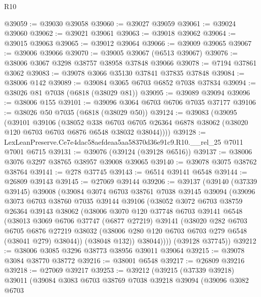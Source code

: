 \begin{lexlean}{R10}
\begin{coremodule}
@39059 := @39030 @39058
@39060 := @39027 @39059
@39061 := @39024 @39060
@39062 := @39021 @39061
@39063 := @39018 @39062
@39064 := @39015 @39063
@39065 := @39012 @39064
@39066 := @39009 @39065
@39067 := @39006 @39066
@39070 := @39005 @39067 (@6513 @39067)
@39076 := @38006 @3067 @3298 @38757 @38958 @37848 @39066
@39078 := @7194 @37861 @3062
@39083 := @39078 @3066 @35130 @37841 @37835 @37848
@39084 := @38006 @142
@39089 := @39084 @3065 @6703 @6852 @7038 @37834
@39094 := @38026 @81 @7038 (@6818 (@38029 @81))
@39095 := @39089 @39094
@39096 := @38006 @155
@39101 := @39096 @3064 @6703 @6706 @7035 @37177
@39106 := @38026 @50 @7035 (@6818 (@38029 @50))
@39124 := @39083
    (@39095
      (@39101
        @39106
        (@38052
          @338
          @6703
          @6705
          @26364
          @6878
          @38062
          (@38020 @120 @6703 @6703 @6876 @6548 @38032 @38044))))
@39128 := LexLeanPreserve.Ce7e4dac58aefdeaa5aa58370d36e91c9.R10.__rel_25 @7011 @7001 @6715
@39131 := @39076 (@39124 (@39128 @6516))
@39137 := @38006 @3076 @3297 @38765 @38957 @39008 @39065
@39140 := @39078 @3075 @38762 @38764
@39141 := @278 @37745
@39143 := @6514 @39141 @6548
@39144 := @26809 @39143
@39145 := @27069 @39144
@39206 := @39137
    (@39140
      (@37339 @39145)
      @39008
      (@39084
        @3074
        @6703
        @38761
        @7038
        @39145
        @39094
        (@39096
          @3073
          @6703
          @38760
          @7035
          @39144
          @39106
          (@38052
            @3072
            @6703
            @38759
            @26364
            @39143
            @38062
            (@38006
              @3070
              @120
              @37748
              @6703
              @39141
              @6548
              (@38013
                @3069
                @6706
                @37747
                (@6877 @27219)
                @39141
                (@38020
                  @282
                  @6703
                  @6705
                  @6876
                  @27219
                  @38032
                  (@38006 @280 @120 @6703 @6703 @279 @6548 (@38041 @279) @38044))
                (@38048 @132))
              @38044))))
      (@39128 @37745))
@39212 := @38006 @3085 @3296 @38773 @38956 @39011 @39064
@39215 := @39078 @3084 @38770 @38772
@39216 := @38001 @6548
@39217 := @26809 @39216
@39218 := @27069 @39217
@39253 := @39212
    (@39215
      (@37339 @39218)
      @39011
      (@39084
        @3083
        @6703
        @38769
        @7038
        @39218
        @39094
        (@39096
          @3082
          @6703

\end{coremodule}
\end{lexlean}
